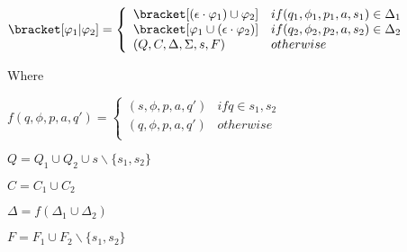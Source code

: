 $\bracket[\varphi_1|\varphi_2]=
\left\{\begin{array}{ll}
\bracket[(\epsilon\cdot\varphi_1)\cup\varphi_2] & if (q_1,\phi_1,p_1,a,s_1)\in\Delta_1 \\
\bracket[\varphi_1\cup(\epsilon\cdot\varphi_2)] & if (q_2,\phi_2,p_2,a,s_2)\in\Delta_2 \\
(Q,C,\Delta,\Sigma,s,F) & otherwise \\
\end{array}\right.
$

Where

$f(q,\phi,p,a,q')=
\left\{\begin{array}{ll}
(s,\phi,p,a,q') & if q\in{s_1,s_2} \\
(q,\phi,p,a,q') & otherwise \\
\end{array}\right.
$

$Q=Q_1\cup Q_2 \cup {s}\backslash\{s_1,s_2\}$

$C=C_1\cup C_2$

$\Delta=f(\Delta_1\cup\Delta_2)$

$F=F_1\cup F_2\backslash\{s_1,s_2\}$
